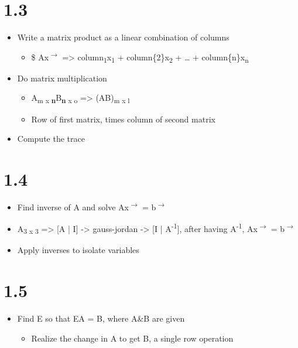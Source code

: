 \documentclass[11pt]{article}
\begin{document}
\section{1.3}
\label{sec:org0332a6a}
\begin{itemize}
\item Write a matrix product as a linear combination of columns
\begin{itemize}
\item \$ Ax\textsuperscript{\(\rightarrow\)} => column\textsubscript{1}x\textsubscript{1} + column\{2\}x\textsubscript{2} + \ldots{} + column\{n\}x\textsubscript{n}
\end{itemize}
\item Do matrix multiplication
\begin{itemize}
\item A\textsubscript{m x \textbf{n}}B\textsubscript{\textbf{n} x o} => (AB)\textsubscript{m x l}
\item Row of first matrix, times column of second matrix
\end{itemize}
\item Compute the trace
\end{itemize}
\section{1.4}
\label{sec:orgaa1ca78}
\begin{itemize}
\item Find inverse of A and solve Ax\textsuperscript{\(\rightarrow\)} = b\textsuperscript{\(\rightarrow\)}
\item A\textsubscript{3 x 3} => [A | I] -> gauss-jordan -> [I | A\textsuperscript{-1}], after having A\textsuperscript{-1}, Ax\textsuperscript{\(\rightarrow\)} = b\textsuperscript{\(\rightarrow\)}
\item Apply inverses to isolate variables
\end{itemize}
\section{1.5}
\label{sec:org4f0d2d8}
\begin{itemize}
\item Find E so that EA = B, where A\&B are given
\begin{itemize}
\item Realize the change in A to get B, a single row operation
\end{itemize}
\end{itemize}
\end{document}
